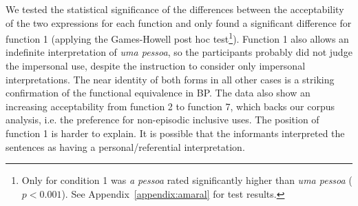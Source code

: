 \documentclass[output=paper]{langscibook}
\begin{document}
{We tested the statistical significance of the differences between the acceptability of the two expressions for each function and only found a significant difference for function 1 (applying the Games-Howell post hoc test}\footnote{Only for condition 1 was \textit{a pessoa} rated significantly higher than \textit{uma pessoa} ($p < 0.001$). See Appendix~\ref{appendix:amaral} for test results.}). 
Function 1 also allows an indefinite interpretation of \textit{uma pessoa}, so the participants probably did not judge the impersonal use, despite the instruction to consider only impersonal interpretations. The near identity of both forms in all other cases is a striking confirmation of the functional equivalence in BP. The data also show an increasing acceptability from function 2 to function 7, which backs our corpus analysis, i.e. the preference for non-episodic inclusive uses. The position of function 1 is harder to explain. It is possible that the informants interpreted the sentences as having a personal/referential interpretation.
\end{document}
